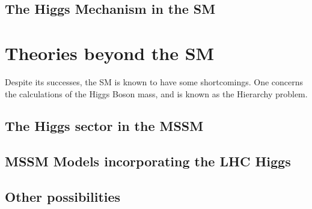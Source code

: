 \subsection{The Higgs Mechanism in the SM}
\label{sec:SMHiggs}

\section{Theories beyond the SM}
\label{sec:BSM}

Despite its successes, the \ac{SM} is known to have some shortcomings. One concerns
the calculations of the Higgs Boson mass, and is known as the Hierarchy problem. 

\subsection{The Higgs sector in the MSSM}

\subsection{MSSM Models incorporating the LHC Higgs}

\subsection{Other possibilities}



